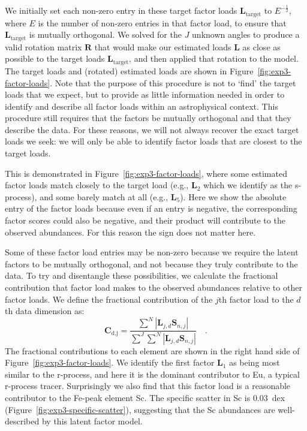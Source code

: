 \documentclass[twocolumn]{aastex62}
\newcommand{\vect}[1]{\boldsymbol{\mathbf{#1}}}
\renewcommand{\vec}[1]{\vect{#1}}
\newcommand{\factorloads}{\textbf{L}}
\newcommand{\factorscores}{\textbf{S}}
\newcommand{\NumLatentFactors}{J}
\begin{document}
We initially set each non-zero entry in these target factor loads $\factorloads_\textrm{target}$ to $E^{-\frac{1}{2}}$, where $E$ is the number of non-zero entries in that factor load, to ensure that $\factorloads_\textrm{target}$ is mutually orthogonal.
We solved for the $\NumLatentFactors$ unknown angles to produce a valid rotation matrix $\vec{R}$ that would make our estimated loads $\factorloads$ as close as possible to the target loads $\factorloads_\textrm{target}$, and then applied that rotation to the model. The target loads and (rotated) estimated loads are shown in Figure~\ref{fig:exp3-factor-loads}. Note that the purpose of this procedure is not to `find' the target loads that we expect, but to provide as little information needed in order to identify and describe all factor loads within an astrophysical context. This procedure still requires that the factors be mutually orthogonal and that they describe the data. For these reasons, we will not always recover the exact target loads we seek: we will only be able to identify factor loads that are closest to the target loads.

This is demonstrated in Figure~\ref{fig:exp3-factor-loads}, where some estimated factor loads match
closely to the target load (e.g., $\mathbf{L}_2$ which we identify as the s-process), and some barely
match at all (e.g., $\mathbf{L}_5$). Here we show the absolute entry of the factor loads because even
if an entry is negative, the corresponding factor scores could also be negative, and their product will contribute to the observed abundances. For this reason the sign does not matter here.

Some of these factor load entries may be non-zero because we require the latent factors to
be mutually orthogonal, and not because they truly contribute to the data. To try and
disentangle these possibilities, we calculate the fractional contribution that factor
load makes to the observed abundances relative to other factor loads. We define the
fractional contribution of the $j$th factor load to the $d$th
data dimension as:
\begin{equation}
	\mathbf{C}_\textrm{d,j} = \frac{\sum^{N}|\factorloads_{j,d}\factorscores_{n,j}|}{\sum^J\sum^{N}|\factorloads_{j,d}\factorscores_{n,j}|} \quad .
\end{equation}
The fractional contributions to each element are shown in the right hand side of
Figure~\ref{fig:exp3-factor-loads}. We identify the first factor $\mathbf{L}_1$ 
as being most similar to the r-process, and here it is the dominant contributor to Eu, a typical r-process tracer. Surprisingly we also find that this factor load is a reasonable  contributor to the Fe-peak element Sc. The specific scatter in Sc is 0.03~dex (Figure~\ref{fig:exp3-specific-scatter}), suggesting that the Sc abundances are well-described by this latent factor model.
 
\end{document}
